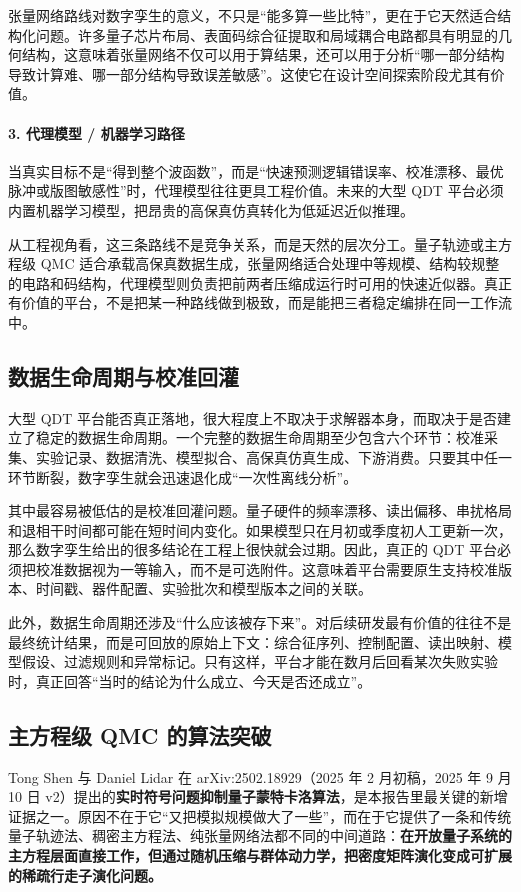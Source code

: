 \documentclass[11pt,a4paper]{article}
\newcommand{\QDT}{QDT}
\begin{document}
张量网络路线对数字孪生的意义，不只是“能多算一些比特”，更在于它天然适合结构化问题。许多量子芯片布局、表面码综合征提取和局域耦合电路都具有明显的几何结构，这意味着张量网络不仅可以用于算结果，还可以用于分析“哪一部分结构导致计算难、哪一部分结构导致误差敏感”。这使它在设计空间探索阶段尤其有价值。

\paragraph{3. 代理模型 / 机器学习路径}
当真实目标不是“得到整个波函数”，而是“快速预测逻辑错误率、校准漂移、最优脉冲或版图敏感性”时，代理模型往往更具工程价值。未来的大型 \QDT{} 平台必须内置机器学习模型，把昂贵的高保真仿真转化为低延迟近似推理。

从工程视角看，这三条路线不是竞争关系，而是天然的层次分工。量子轨迹或主方程级 QMC 适合承载高保真数据生成，张量网络适合处理中等规模、结构较规整的电路和码结构，代理模型则负责把前两者压缩成运行时可用的快速近似器。真正有价值的平台，不是把某一种路线做到极致，而是能把三者稳定编排在同一工作流中。

\subsection{数据生命周期与校准回灌}

大型 \QDT{} 平台能否真正落地，很大程度上不取决于求解器本身，而取决于是否建立了稳定的数据生命周期。一个完整的数据生命周期至少包含六个环节：校准采集、实验记录、数据清洗、模型拟合、高保真仿真生成、下游消费。只要其中任一环节断裂，数字孪生就会迅速退化成“一次性离线分析”。

其中最容易被低估的是校准回灌问题。量子硬件的频率漂移、读出偏移、串扰格局和退相干时间都可能在短时间内变化。如果模型只在月初或季度初人工更新一次，那么数字孪生给出的很多结论在工程上很快就会过期。因此，真正的 \QDT{} 平台必须把校准数据视为一等输入，而不是可选附件。这意味着平台需要原生支持校准版本、时间戳、器件配置、实验批次和模型版本之间的关联。

此外，数据生命周期还涉及“什么应该被存下来”。对后续研发最有价值的往往不是最终统计结果，而是可回放的原始上下文：综合征序列、控制配置、读出映射、模型假设、过滤规则和异常标记。只有这样，平台才能在数月后回看某次失败实验时，真正回答“当时的结论为什么成立、今天是否还成立”。

\subsection{主方程级 QMC 的算法突破}

Tong Shen 与 Daniel Lidar 在 arXiv:2502.18929（2025 年 2 月初稿，2025 年 9 月 10 日 v2）提出的\textbf{实时符号问题抑制量子蒙特卡洛算法}，是本报告里最关键的新增证据之一。原因不在于它“又把模拟规模做大了一些”，而在于它提供了一条和传统量子轨迹法、稠密主方程法、纯张量网络法都不同的中间道路：\textbf{在开放量子系统的主方程层面直接工作，但通过随机压缩与群体动力学，把密度矩阵演化变成可扩展的稀疏行走子演化问题。}
\end{document}
